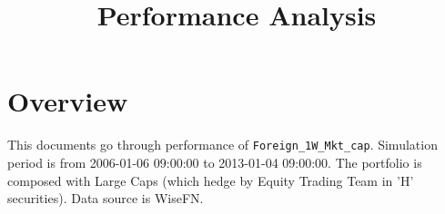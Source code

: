 \documentclass{article}
\begin{document}




\title{Performance Analysis}
\author{}
\date{}

\maketitle


\section{Overview}
This documents go through performance of \verb|Foreign_1W_Mkt_cap|. Simulation period is from 2006-01-06 09:00:00 to 2013-01-04 09:00:00. The portfolio is composed with Large Caps (which hedge by Equity Trading Team in 'H' securities). Data source is WiseFN.
\end{document}
